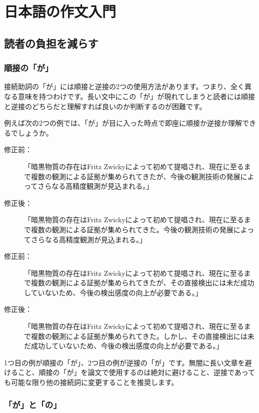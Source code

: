 \chapter{日本語の作文入門}

\section{読者の負担を減らす}

\subsection{順接の「が」}

接続助詞の「が」には順接と逆接の2つの使用方法があります。つまり、全く異なる意味を持つわけです。長い文中にこの「が」が現れてしまうと読者には順接と逆接のどちらだと理解すれば良いのか判断するのが困難です。

例えば次の2つの例では、「が」が目に入った時点で即座に順接か逆接か理解できるでしょうか。

\begin{description}
\item[修正前：]「暗黒物質の存在はFritz Zwickyによって初めて提唱され、現在に至るまで複数の観測による証拠が集められてきたが、今後の観測技術の発展によってさらなる高精度観測が見込まれる。」
\item[修正後：]「暗黒物質の存在はFritz Zwickyによって初めて提唱され、現在に至るまで複数の観測による証拠が集められてきた。今後の観測技術の発展によってさらなる高精度観測が見込まれる。」
\end{description}

\begin{description}
\item[修正前：]「暗黒物質の存在はFritz Zwickyによって初めて提唱され、現在に至るまで複数の観測による証拠が集められてきたが、その直接検出には未だ成功していないため、今後の検出感度の向上が必要である。」
\item[修正後：]「暗黒物質の存在はFritz Zwickyによって初めて提唱され、現在に至るまで複数の観測による証拠が集められてきた。しかし、その直接検出には未だ成功していないため、今後の検出感度の向上が必要である。」
\end{description}

1つ目の例が順接の「が」、2つ目の例が逆接の「が」です。無闇に長い文章を避けること、順接の「が」を論文で使用するのは絶対に避けること、逆接であっても可能な限り他の接続詞に変更することを推奨します。

\subsection{「が」と「の」}

